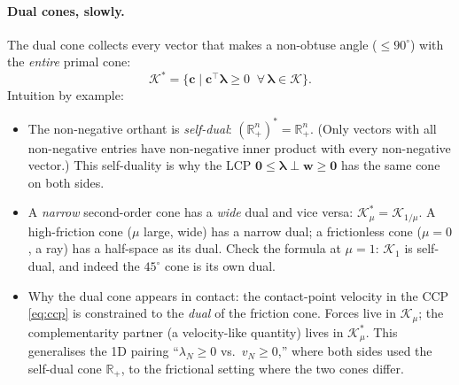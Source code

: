 \documentclass[11pt,twoside]{report}
\theoremstyle{definition}
\theoremstyle{plain}
\theoremstyle{remark}
\newcommand{\R}{\mathbb{R}}
\newcommand{\0}{\bm{0}}
\newcommand{\Kc}{\mathcal{K}}
\begin{document}
\paragraph{Dual cones, slowly.}
The dual cone collects every vector that makes a non-obtuse angle
($\le 90^{\circ}$) with the \emph{entire} primal cone:
\begin{equation}
\Kc^{*}=\{\bm{c}\;|\;\bm{c}^{\!\top}\bm{\lambda}\ge 0
\;\;\forall\,\bm{\lambda}\in\Kc\}.
\end{equation}
Intuition by example:
\begin{itemize}
\item The non-negative orthant is \emph{self-dual}:
      $(\R^{n}_{+})^{*}=\R^{n}_{+}$. (Only vectors with all
      non-negative entries have non-negative inner product with every
      non-negative vector.) This self-duality is why the LCP
      $\0\le\bm{\lambda}\perp\bm{w}\ge\0$ has the same cone on both
      sides.
\item A \emph{narrow} second-order cone has a \emph{wide} dual and
      vice versa: $\Kc_{\mu}^{*}=\Kc_{1/\mu}$. A high-friction cone
      ($\mu$ large, wide) has a narrow dual; a frictionless cone
      ($\mu=0$, a ray) has a half-space as its dual.
      Check the formula at $\mu=1$: $\Kc_{1}$ is self-dual,
      and indeed the $45^{\circ}$ cone is its own dual.
\item Why the dual cone appears in contact: the contact-point velocity
      in the CCP \eqref{eq:ccp} is constrained to the \emph{dual} of
      the friction cone. Forces live in $\Kc_{\mu}$; the
      complementarity partner (a velocity-like quantity) lives in
      $\Kc_{\mu}^{*}$. This generalises the 1D pairing
      ``$\lambda_{N}\ge 0$ vs.\ $v_{N}\ge 0$,'' where both sides used
      the self-dual cone $\R_{+}$, to the frictional setting where
      the two cones differ.
\end{itemize}
\end{document}
